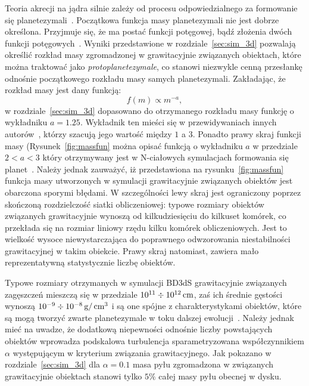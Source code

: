 \par Teoria akrecji na jądra silnie zależy od procesu odpowiedzialnego za
formowanie się planetezymali~\cite{HBP13}. Początkowa funkcja masy planetezymali
nie jest dobrze określona. Przyjmuje się, że ma postać funkcji potęgowej, bądź
złożenia dwóch funkcji potęgowych~\cite{R03}. Wyniki przedstawione w
rozdziale~\ref{sec:sim_3d} pozwalają określić rozkład masy zgromadzonej w
grawitacyjnie związanych obiektach, które można traktować jako
\emph{protoplanetezymale}, co stanowi niezwykle cenną przesłankę odnośnie
początkowego rozkładu masy samych planetezymali. Zakładając, że rozkład masy
jest dany funkcją:
%
\begin{equation}
   f(m) \propto m^{-a},
\end{equation}
%
w rozdziale~\ref{sec:sim_3d} dopasowano do otrzymanego rozkładu masy funkcję o
wykładniku $a = 1.25$. Wykładnik ten mieści się w przewidywaniach innych
autorów~\cite{R03}, którzy szacują jego wartość między $1$ a $3$. Ponadto prawy
skraj funkcji masy (Rysunek~\ref{fig:massfun} można opisać funkcją o wykładniku
$a$ w przedziale $2 < a < 3$ który otrzymywany jest w N-ciałowych symulacjach
formowania się planet~\cite{MFFK98}.  Należy jednak zauważyć, iż przedstawiona
na rysunku~\ref{fig:massfun} funkcja masy utworzonych w symulacji grawitacyjnie
związanych obiektów jest obarczona sporymi błędami. W szczególności lewy skraj
jest ograniczony poprzez skończoną rozdzielczość siatki obliczeniowej:
typowe rozmiary obiektów związanych grawitacyjnie wynoszą od kilkudziesięciu do
kilkuset komórek, co przekłada się na rozmiar liniowy rzędu kilku komórek
obliczeniowych. Jest to wielkość wysoce niewystarczająca do poprawnego
odwzorowania niestabilności grawitacyjnej w takim obiekcie.
Prawy skraj natomiast, zawiera mało reprezentatywną statystycznie liczbę obiektów.
%
\par Typowe rozmiary otrzymanych w symulacji BD3dS grawitacyjnie związanych
zagęszczeń mieszczą się w przedziale $10^{11} \div 10^{12}\hbox{$\thinspace\textrm{cm}$}$, zaś ich średnie
gęstości wynoszą $10^{-9} \div 10^{-8}\hbox{$\thinspace\textrm{g}$}/\hbox{$\thinspace\textrm{cm}$}^3$ i są one spójne z
charakterystykami obiektów, które są mogą tworzyć zwarte planetezymale w toku
dalszej ewolucji~\cite{HS08}. Należy jednak mieć na uwadze, że dodatkową
niepewności odnośnie liczby powstających obiektów wprowadza podskalowa
turbulencja sparametryzowana współczynnikiem $\alpha$ występującym w kryterium
związania grawitacyjnego. Jak pokazano w
rozdziale~\ref{sec:sim_3d} dla $\alpha = 0.1$ masa pyłu zgromadzona w związanych
grawitacyjnie obiektach stanowi tylko $5\%$ całej masy pyłu obecnej w dysku.
